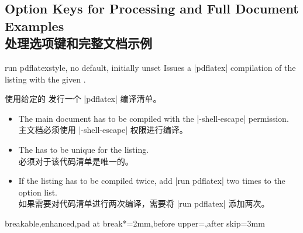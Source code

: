 \subsection{Option Keys for Processing and Full Document Examples\\处理选项键和完整文档示例}\label{sec:proclistingkeys}
% 
% 
% 
% 
% 




\begin{docTcbKey}[][doc new=2014-11-14]{run pdflatex}{}{style, no default, initially unset}
Issues a |pdflatex| compilation of the listing with the given .

使用给定的  发行一个 |pdflatex| 编译清单。
\begin{itemize}
\item The main document has to be compiled with the |-shell-escape| permission.
\\主文档必须使用 |-shell-escape| 权限进行编译。
\item The  has to be unique for the listing.
\\ 必须对于该代码清单是唯一的。
\item If the listing has to be compiled twice, add |run pdflatex| two times to
the option list.
\\如果需要对代码清单进行两次编译，需要将 |run pdflatex| 添加两次。
\end{itemize}

\begin{dispListing*}{breakable,enhanced,pad at break*=2mm,before upper=,after skip=3mm}
\end{dispListing*}
\end{docTcbKey}
